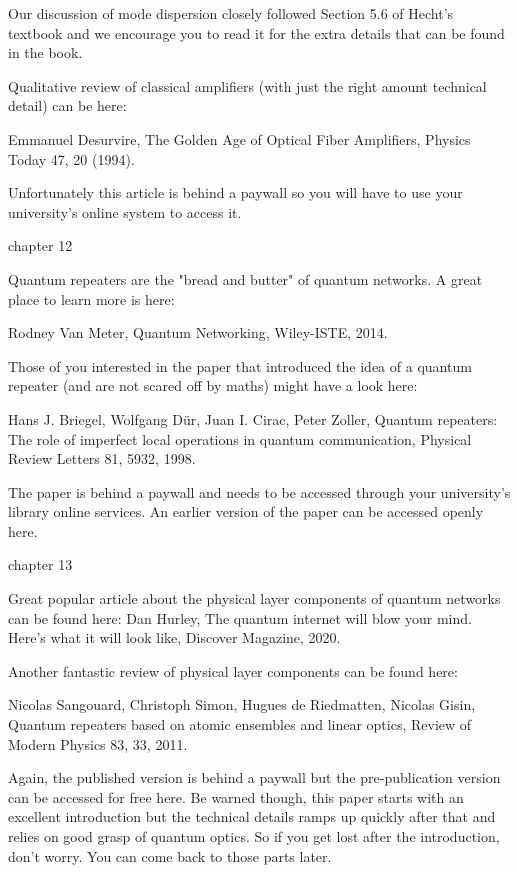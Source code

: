 Our discussion of mode dispersion closely followed Section 5.6 of Hecht’s textbook and we encourage you to read it for the extra details that can be found in the book.

Qualitative review of classical amplifiers (with just the right amount technical detail) can be here:

Emmanuel Desurvire, The Golden Age of Optical Fiber Amplifiers, Physics Today 47, 20 (1994).

Unfortunately this article is behind a paywall so you will have to use your university’s online system to access it.

chapter 12

Quantum repeaters are the "bread and butter" of quantum networks. A great place to learn more is here:

Rodney Van Meter, Quantum Networking, Wiley-ISTE, 2014.

Those of you interested in the paper that introduced the idea of a quantum repeater (and are not scared off by maths) might have a look here:

Hans J. Briegel, Wolfgang Dür, Juan I. Cirac, Peter Zoller, Quantum repeaters: The role of imperfect local operations in quantum communication, Physical Review Letters 81, 5932, 1998.

The paper is behind a paywall and needs to be accessed through your university’s library online services. An earlier version of the paper can be accessed openly here.

chapter 13

Great popular article about the physical layer components of quantum networks can be found here:
Dan Hurley, The quantum internet will blow your mind. Here’s what it will look like, Discover Magazine, 2020.

Another fantastic review of physical layer components can be found here:

Nicolas Sangouard, Christoph Simon, Hugues de Riedmatten, Nicolas Gisin, Quantum repeaters based on atomic ensembles and linear optics, Review of Modern Physics 83, 33, 2011.

Again, the published version is behind a paywall but the pre-publication version can be accessed for free here. Be warned though, this paper starts with an excellent introduction but the technical details ramps up quickly after that and relies on good grasp of quantum optics. So if you get lost after the introduction, don’t worry. You can come back to those parts later.
